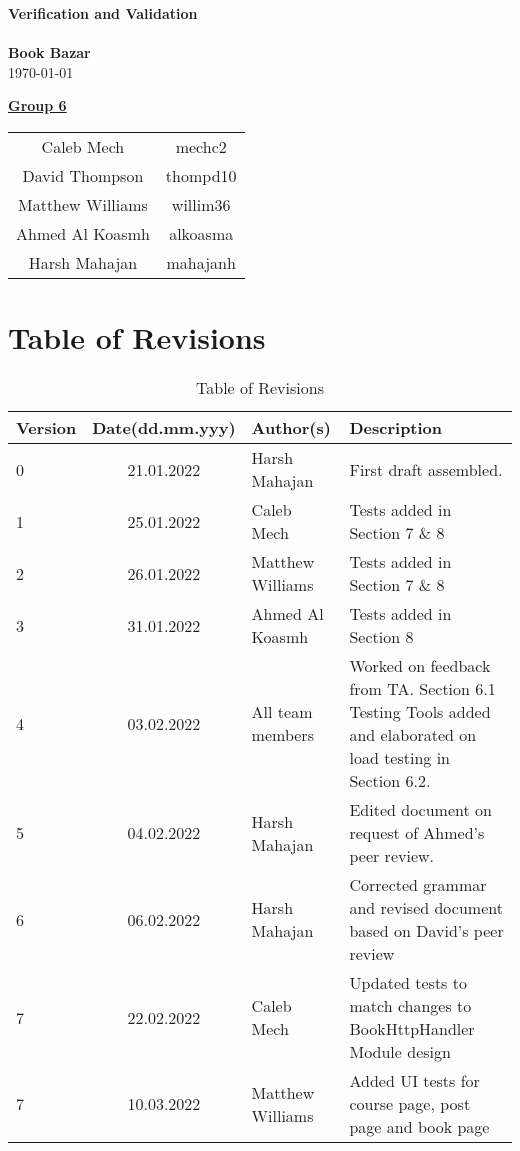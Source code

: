 \documentclass[fullpage]{article}
\begin{document}
\vspace*{\fill}
\begin{center}

  {\Huge \textbf{Verification and Validation}}\\
\hrulefill\\[2mm]
  {\huge \textbf{Book Bazar}}\\[2mm]
{\large \today}\\[15mm]
{\large
\underline{\textbf{Group 6}}\\
\begin{tabular}{ c c }

 Caleb Mech & mechc2\\
 David Thompson & thompd10\\
 Matthew Williams & willim36\\
 Ahmed Al Koasmh & alkoasma\\
 Harsh Mahajan	& mahajanh
\end{tabular}
}

\end{center}

\vspace*{\fill}

\newpage
\begingroup
\hypersetup{hidelinks}
\tableofcontents

\listoffigures
\listoftables
\endgroup
\newpage

\section{Table of Revisions}
\begin{table}[h]
\centering
\begin{tabular}{| l | c | p{4cm}| p{5cm}|}
\hline
 \rowcolor{lightgray}
\textbf{Version} & \textbf{Date(dd.mm.yyy)} &\textbf{Author(s)} &\textbf{Description}\\
\hline
0 & 21.01.2022 & Harsh Mahajan & First draft assembled.\\
\hline
1 & 25.01.2022 & Caleb Mech & Tests added in Section 7 \& 8\\
\hline
2 & 26.01.2022 & Matthew Williams & Tests added in Section 7 \& 8\\
\hline
3 & 31.01.2022 & Ahmed Al Koasmh & Tests added in Section 8\\
\hline
4& 03.02.2022& All team members & Worked on feedback from TA. Section 6.1 Testing Tools added and elaborated on load testing in Section 6.2.\\
\hline
5& 04.02.2022& Harsh Mahajan & Edited document on request of Ahmed's peer review.\\
\hline
6& 06.02.2022& Harsh Mahajan& Corrected grammar and revised document based on David's peer review\\
\hline
7& 22.02.2022& Caleb Mech & Updated tests to match changes to BookHttpHandler Module design\\
\hline
7& 10.03.2022& Matthew Williams & Added UI tests for course page, post page and book page\\
\hline
\end{tabular}
\caption{Table of Revisions}

\end{table}
\end{document}
